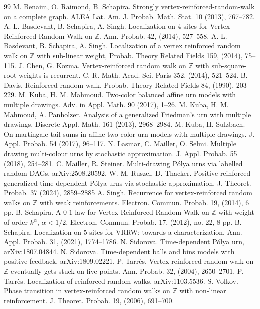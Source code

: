 \documentclass[10pt,a4paper]{amsart}
\newcommand{\1}{{\text{\Large $\mathfrak 1$}}}
\begin{document}
\begin{thebibliography}{99}
 M. Benaim, O. Raimond, B. Schapira. Strongly vertex-reinforced-random-walk on a complete graph. ALEA Lat. Am. J. Probab. Math. Stat. 10 (2013), 767--782.
 A.-L. Basdevant, B. Schapira, A. Singh. Localization on $4$ sites for Vertex Reinforced Random Walk on $\mathbb Z$. Ann. Probab. 42, (2014), 527--558.
 A.-L. Basdevant, B. Schapira, A. Singh. Localization of a vertex reinforced random walk on $\mathbb Z$ with sub-linear weight, Probab. Theory Related Fields 159, (2014), 75--115.
 J. Chen, G. Kozma. Vertex-reinforced random walk on $\mathbb Z$ with sub-square-root weights is recurrent. C. R. Math. Acad. Sci. Paris 352, (2014), 521--524.
 B. Davis. Reinforced random walk. Probab. Theory Related Fields 84, (1990), 203--229.
 M. Kuba, H. M. Mahmoud. Two-color balanced affine urn models with multiple drawings. Adv. in Appl. Math. 90 (2017), 1--26.
 M. Kuba, H. M. Mahmoud, A. Panholzer. Analysis of a generalized Friedman's urn with multiple drawings. Discrete Appl. Math. 161 (2013), 2968--2984.
 M. Kuba, H. Sulzbach. On martingale tail sums in affine two-color urn models with multiple drawings. J. Appl. Probab. 54 (2017), 96--117.
 N. Lasmar, C. Mailler, O. Selmi. Multiple drawing multi-colour urns by stochastic approximation. J. Appl. Probab. 55 (2018), 254--281.
 C. Mailler, R. Steiner. Multi-drawing P\'olya urns via labelled random DAGs, arXiv:2508.20592.
 W. M. Ruszel, D. Thacker. Positive reinforced generalized time-dependent P\'olya urns via stochastic approximation. J. Theoret. Probab. 37 (2024), 2859--2885
 A. Singh. Recurrence for vertex-reinforced random walks on $\mathbb Z$ with weak reinforcements. Electron. Commun. Probab. 19, (2014), 6 pp.
 B. Schapira. A $0$-$1$ law for Vertex Reinforced Random Walk on $\mathbb Z$ with weight of order $k^\alpha$, $\alpha<1/2$, Electron. Commun. Probab. 17, (2012), no. 22, 8 pp.
 B. Schapira. Localization on $5$ sites for VRRW: towards a characterization. Ann. Appl. Probab. 31, (2021), 1774--1786.
 N. Sidorova. Time-dependent P\'olya urn, arXiv:1807.04844.
 N. Sidorova. Time-dependent balls and bins models with positive feedback, arXiv:1809.02221.
 P. Tarr\`es. Vertex-reinforced random walk on $\mathbb Z$ eventually gets stuck on five points. Ann. Probab. 32, (2004), 2650--2701.
 P. Tarr\`es. Localization of reinforced random walks, arXiv:1103.5536.
 S. Volkov. Phase transition in vertex-reinforced random walks on $\mathbb Z$ with non-linear reinforcement. J. Theoret. Probab. 19, (2006), 691--700.
\end{thebibliography}
\end{document}
